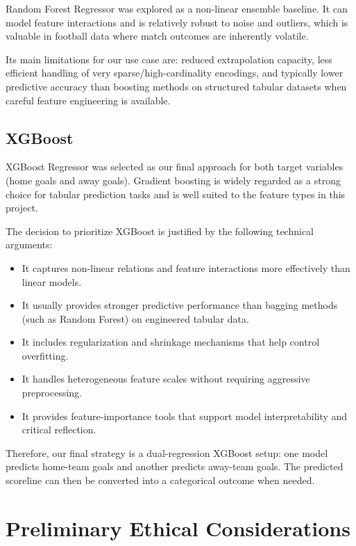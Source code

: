 \documentclass{article}
\begin{document}
Random Forest Regressor was explored as a non-linear ensemble baseline. It can model feature interactions and is relatively robust to noise and outliers, which is valuable in football data where match outcomes are inherently volatile.

Its main limitations for our use case are: reduced extrapolation capacity, less efficient handling of very sparse/high-cardinality encodings, and typically lower predictive accuracy than boosting methods on structured tabular datasets when careful feature engineering is available.

\subsection{XGBoost}

XGBoost Regressor was selected as our final approach for both target variables (home goals and away goals). Gradient boosting is widely regarded as a strong choice for tabular prediction tasks and is well suited to the feature types in this project.

The decision to prioritize XGBoost is justified by the following technical arguments:

\begin{itemize}
	\item It captures non-linear relations and feature interactions more effectively than linear models.
	\item It usually provides stronger predictive performance than bagging methods (such as Random Forest) on engineered tabular data.
	\item It includes regularization and shrinkage mechanisms that help control overfitting.
	\item It handles heterogeneous feature scales without requiring aggressive preprocessing.
	\item It provides feature-importance tools that support model interpretability and critical reflection.
\end{itemize}

Therefore, our final strategy is a dual-regression XGBoost setup: one model predicts home-team goals and another predicts away-team goals. The predicted scoreline can then be converted into a categorical outcome when needed.

\section{Preliminary Ethical Considerations}
\end{document}
